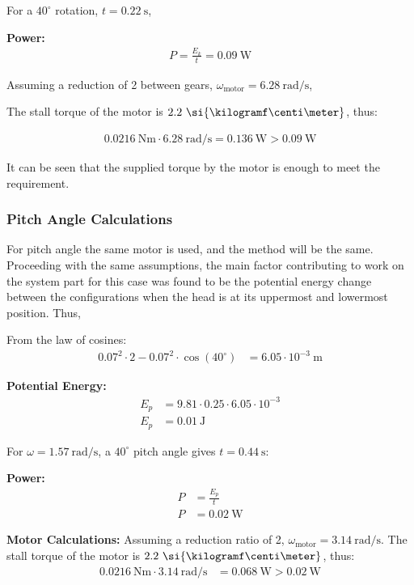 \documentclass[12pt]{report}
\begin{document}
For a \(40^\circ\) rotation, \(t = 0.22\ \si{\second}\),

\textbf{Power:}
\begin{align}
P = \frac{E_k}{t} = 0.09\ \si{\watt}
\end{align}

Assuming a reduction of 2 between gears, \(\omega_\text{motor} = 6.28\ \si{\radian\per\second}\),

The stall torque of the motor is \(2.2\ \si{\kilogramf\centi\meter}\), thus:

\begin{align}
0.0216\ \si{\newton\meter} \cdot 6.28\ \si{\radian\per\second} = 0.136\ \si{\watt} > 0.09\ \si{\watt}
\end{align}

It can be seen that the supplied torque by the motor is enough to meet the requirement.

\subsubsection{Pitch Angle Calculations}

For pitch angle the same motor is used, and the method will be the same. Proceeding with the same assumptions, the main factor contributing to work on the system part for this case was found to be the potential energy change between the configurations when the head is at its uppermost and lowermost position. Thus,

From the law of cosines:
\begin{align}
0.07^2 \cdot 2 - 0.07^2 \cdot \cos(40^\circ) &= 6.05 \cdot 10^{-3}\ \si{\meter}
\end{align}

\textbf{Potential Energy:}
\begin{align}
E_p &= 9.81 \cdot 0.25 \cdot 6.05 \cdot 10^{-3} \\
E_p &= 0.01\ \si{\joule}
\end{align}

For \(\omega = 1.57\ \si{\radian\per\second}\), a \(40^\circ\) pitch angle gives \(t = 0.44\ \si{\second}\):

\textbf{Power:}
\begin{align}
P &= \frac{E_p}{t} \\
P &= 0.02\ \si{\watt}
\end{align}

\textbf{Motor Calculations:}  
Assuming a reduction ratio of 2, \(\omega_\text{motor} = 3.14\ \si{\radian\per\second}\).  
The stall torque of the motor is \(2.2\ \si{\kilogramf\centi\meter}\), thus:
\begin{align}
0.0216\ \si{\newton\meter} \cdot 3.14\ \si{\radian\per\second} &= 0.068\ \si{\watt} > 0.02\ \si{\watt}
\end{align}
\end{document}
